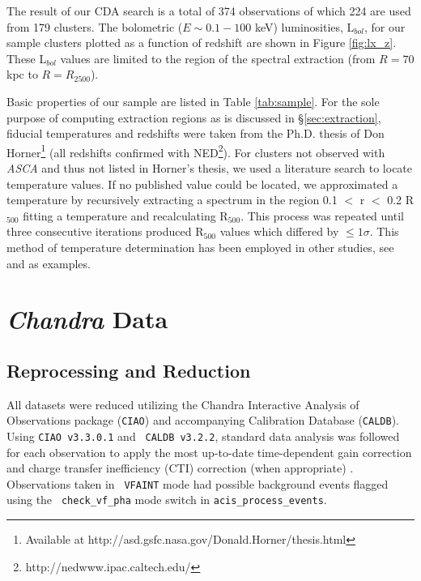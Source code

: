 \documentclass{emulateapj}
\begin{document}
The result of our CDA search is a total of 374 observations of which
224 are used from 179 clusters. The bolometric ($E \sim 0.1-100$ keV)
luminosities, L$_{bol}$, for our sample clusters plotted as a function of
redshift are shown in Figure \ref{fig:lx_z}. These L$_{bol}$ values
are limited to the region of the spectral extraction (from $R=70$ kpc
to $R=R_{2500}$).

Basic properties of our sample are listed in Table
\ref{tab:sample}. For the sole purpose of computing extraction regions
as is discussed in \S\ref{sec:extraction}, fiducial temperatures and
redshifts were taken from the Ph.D. thesis of Don Horner\footnote{Available at
http://asd.gsfc.nasa.gov/Donald.Horner/thesis.html} (all redshifts confirmed with
NED\footnote{http://nedwww.ipac.caltech.edu/}). For clusters not
observed with {\textit{ASCA}} and thus not listed in Horner's thesis,
we used a literature search to locate temperature values. If no published value
could be located, we approximated a temperature by recursively
extracting a spectrum in the region 0.1 $<$ r $<$ 0.2 R$_{500}$
fitting a temperature and recalculating R$_{500}$. This process was
repeated until three consecutive iterations produced R$_{500}$ values
which differed by $\leq 1\sigma$. This method of temperature
determination has been employed in other studies, see
\cite{2006MNRAS.tmp.1068S} and \cite{2006ApJS..162..304H} as
examples.

\section{\textit{Chandra} Data}\label{sec:data}

\subsection{Reprocessing and Reduction}\label{sec:reprocessing}

All datasets were reduced utilizing the Chandra Interactive Analysis of
Observations package ({\tt CIAO}) and accompanying Calibration
Database ({\tt CALDB}). Using {\tt CIAO v3.3.0.1} and {\tt
CALDB v3.2.2}, standard data analysis was followed for each
observation to apply the most up-to-date time-dependent gain
correction and charge transfer inefficiency (CTI) correction (when
appropriate) \citep{2000ApJ...534L.139T}. Observations taken in {\tt
VFAINT} mode had possible background events flagged using the {\tt
check\_vf\_pha} mode switch in {\tt acis\_process\_events}.
\end{document}
